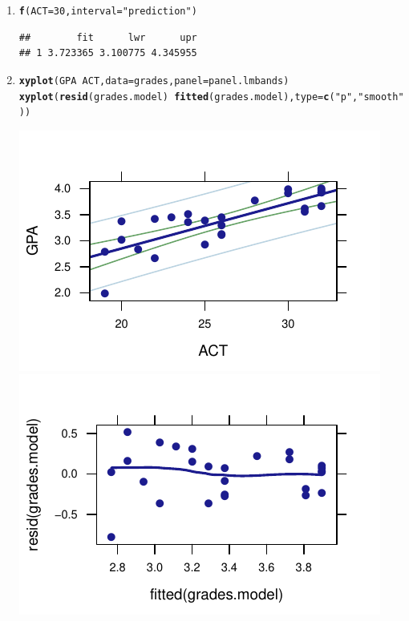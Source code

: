 \documentclass[twoside]{book}\usepackage[]{graphicx}\usepackage[]{xcolor}
\makeatletter
\def\maxwidth{ %
  \ifdim\Gin@nat@width>\linewidth
    \linewidth
  \else
    \Gin@nat@width
  \fi
}
\newcommand{\hlnum}[1]{\textcolor[rgb]{0.686,0.059,0.569}{#1}}%
\newcommand{\hlstr}[1]{\textcolor[rgb]{0.192,0.494,0.8}{#1}}%
\newcommand{\hlopt}[1]{\textcolor[rgb]{0,0,0}{#1}}%
\newcommand{\hlstd}[1]{\textcolor[rgb]{0.345,0.345,0.345}{#1}}%
\newcommand{\hlkwc}[1]{\textcolor[rgb]{0.333,0.667,0.333}{#1}}%
\newcommand{\hlkwd}[1]{\textcolor[rgb]{0.737,0.353,0.396}{\textbf{#1}}}%
\newenvironment{kframe}{%
 \def\at@end@of@kframe{}%
 \ifinner\ifhmode%
  \def\at@end@of@kframe{\end{minipage}}%
  \begin{minipage}{\columnwidth}%
 \fi\fi%
 \def\FrameCommand##1{\hskip\@totalleftmargin \hskip-\fboxsep
 \colorbox{shadecolor}{##1}\hskip-\fboxsep
     \hskip-\linewidth \hskip-\@totalleftmargin \hskip\columnwidth}%
 \MakeFramed {\advance\hsize-\width
   \@totalleftmargin\z@ \linewidth\hsize
   \@setminipage}}%
 {\par\unskip\endMakeFramed%
 \at@end@of@kframe}
\newenvironment{knitrout}{}{} %
\makeatother
\begin{document}
\begin{solution}
\begin{enumerate}
		\item
\begin{knitrout}
\color{fgcolor}\begin{kframe}
\begin{alltt}
\hlkwd{f}\hlstd{(}\hlkwc{ACT} \hlstd{=} \hlnum{30}\hlstd{,} \hlkwc{interval} \hlstd{=} \hlstr{"prediction"}\hlstd{)}
\end{alltt}
\begin{verbatim}
##        fit      lwr      upr
## 1 3.723365 3.100775 4.345955
\end{verbatim}
\end{kframe}
\end{knitrout}
		\item
\begin{knitrout}
\color{fgcolor}\begin{kframe}
\begin{alltt}
\hlkwd{xyplot}\hlstd{(GPA} \hlopt{~} \hlstd{ACT,} \hlkwc{data} \hlstd{= grades,} \hlkwc{panel} \hlstd{= panel.lmbands)}
\hlkwd{xyplot}\hlstd{(}\hlkwd{resid}\hlstd{(grades.model)} \hlopt{~} \hlkwd{fitted}\hlstd{(grades.model),} \hlkwc{type} \hlstd{=} \hlkwd{c}\hlstd{(}\hlstr{"p"}\hlstd{,} \hlstr{"smooth"}\hlstd{))}
\end{alltt}
\end{kframe}

{\centering \includegraphics[width=\maxwidth]{figures/fig-unnamed-chunk-218-1} 
\includegraphics[width=\maxwidth]{figures/fig-unnamed-chunk-218-2} 

}
\end{knitrout}
\end{enumerate}
\end{solution}
\end{document}
